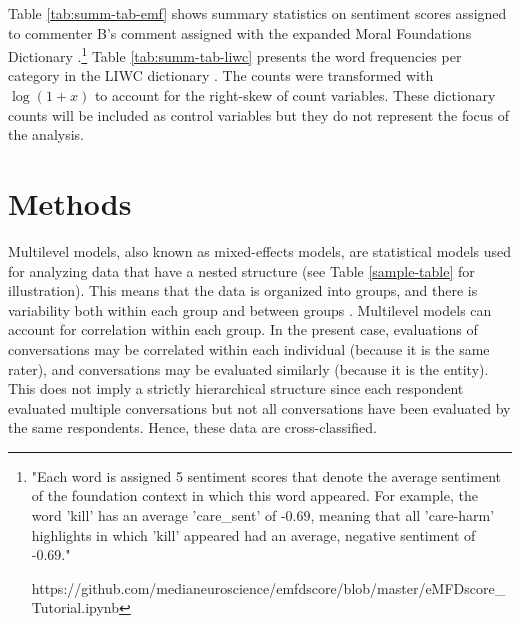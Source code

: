 \documentclass{article}
\begin{document}

Table \ref{tab:summ-tab-emf} shows summary statistics on sentiment scores assigned to commenter B's comment assigned with the expanded Moral Foundations Dictionary \citep{hopp2021extended}.\footnote{"Each word is assigned 5 sentiment scores that denote the average sentiment of the foundation context in which this word appeared. For example, the word 'kill' has an average 'care_sent' of -0.69, meaning that all 'care-harm' highlights in which 'kill' appeared had an average, negative sentiment of -0.69." 

https://github.com/medianeuroscience/emfdscore/blob/master/eMFDscore_Tutorial.ipynb}
Table \ref{tab:summ-tab-liwc} presents the word frequencies per category in the LIWC dictionary \citep{pennebaker_linguistic_2022}. The counts were transformed with $\log(1+x)$ to account for the right-skew of count variables. These dictionary counts will be included as control variables but they do not represent the focus of the analysis.

\section{Methods}

Multilevel models, also known as mixed-effects models, are statistical models used for analyzing data that have a nested structure (see Table \ref{sample-table}  for illustration). This means that the data is organized into groups, and there is variability both within each group and between groups \citep{hox2017multilevel}. Multilevel models can account for correlation within each group. In the present case, evaluations of conversations may be correlated within each individual (because it is the same rater), and conversations may be evaluated similarly (because it is the entity). This does not imply a strictly hierarchical structure since each respondent evaluated multiple conversations but not all conversations have been evaluated by the same respondents. Hence, these data are cross-classified.
\end{document}
